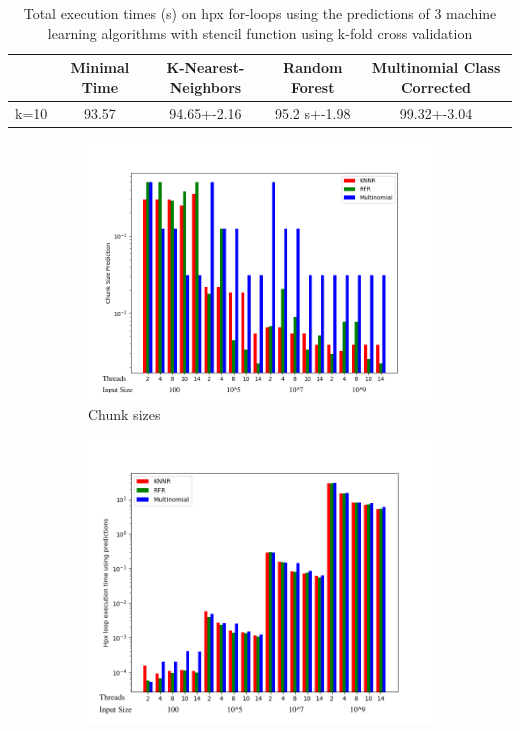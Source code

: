 \begin{table}[h]
	\centering
	\caption{Total execution times (s) on hpx for-loops using the predictions of 3 machine learning algorithms with stencil function using k-fold cross validation}
	\label{my-label}
	\begin{tabular}{|c|c|c|c|c|}
		\hline
		& Minimal Time &K-Nearest-Neighbors & Random Forest &Multinomial Class Corrected\\ \hline
		k=10 & 93.57&94.65+-2.16  & 95.2 s+-1.98 & 99.32+-3.04\\ \hline
	\end{tabular}
\end{table}
\begin{figure}[h]
	\centering
	\begin{subfigure}[b]{0.5\textwidth}
		\centering
		\includegraphics[width=\textwidth]{images/stencil_predictions_bars.png}
		\caption[Network2]%
		{{Chunk sizes}}    
	\end{subfigure}
	\hfill
	\begin{subfigure}[b]{0.49\textwidth}  
		\centering 
		\includegraphics[width=\textwidth]{images/stencil_times_bars.png}

\end{subfigure}
\end{figure}
